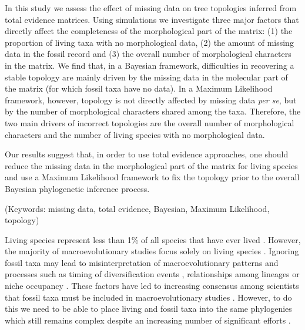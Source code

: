 \documentclass[12pt,letterpaper]{article}
\begin{document}
In this study we assess the effect of missing data on tree topologies inferred from total evidence matrices.
Using simulations we investigate three major factors that directly affect the completeness of the morphological part of the matrix:
(1) the proportion of living taxa with no morphological data,
(2) the amount of missing data in the fossil record and
(3) the overall number of morphological characters in the matrix.
We find that, in a Bayesian framework, difficulties in recovering a stable topology are mainly driven by the missing data in the molecular part of the matrix (for which fossil taxa have no data).
In a Maximum Likelihood framework, however, topology is not directly affected by missing data \textit{per se}, but by the number of morphological characters shared among the taxa.
Therefore, the two main drivers of incorrect topologies are the overall number of morphological characters and the number of living species with no morphological data.

Our results suggest that, in order to use total evidence approaches, one should reduce the missing data in the morphological part of the matrix for living species and use a Maximum Likelihood framework to fix the topology prior to the overall Bayesian phylogenetic inference process.

\noindent (Keywords: missing data, total evidence, Bayesian, Maximum Likelihood, topology)\\

\vspace{1.5in}

\newpage 


%
%


Living species represent less than 1\% of all species that have ever lived \citep{novacek1992ext,raup1993extinction}.
However, the majority of macroevolutionary studies focus solely on living species \citep{cooperwhat2009,meredithimpacts2011,healyecology2014}. %
Ignoring fossil taxa may lead to misinterpretation of macroevolutionary patterns and processes such as timing of diversification events \citep[e.g.][]{pyrondivergence2011}, relationships among lineages \citep[e.g.][]{manosphylogeny2007} or niche occupancy \citep[e.g.][]{pearmanniche2008}.
These factors have led to increasing consensus among scientists that fossil taxa must be included in macroevolutionary studies \citep{jacksonwhat2006,quentaldiversity2010,dietlconservation2011,slaterunifying2013,fritzdiversity2013}.
However, to do this we need to be able to place living and fossil taxa into the same phylogenies which still remains complex despite an increasing number of significant efforts \citep{pyrondivergence2011,ronquista2012,schragocombining2013}. %
\end{document}
